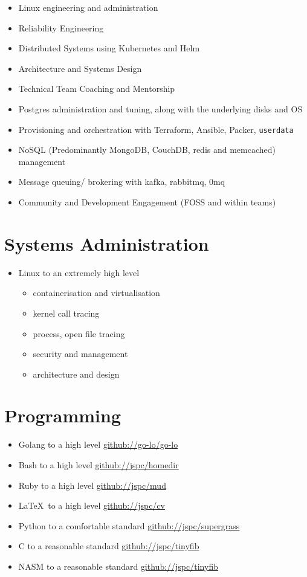 \documentclass[11pt,a4paper,sans]{article}
\begin{document}
\begin{itemize}
\item Linux engineering and administration
\item Reliability Engineering
\item Distributed Systems using Kubernetes and Helm
\item Architecture and Systems Design
\item Technical Team Coaching and Mentorship
\item Postgres administration and tuning, along with the underlying disks and OS
\item Provisioning and orchestration with Terraform, Ansible, Packer, \texttt{userdata}
\item NoSQL (Predominantly MongoDB, CouchDB, redis and memcached) management
\item Message queuing/ brokering with kafka, rabbitmq, 0mq
\item Community and Development Engagement (FOSS and within teams)
\end{itemize}

\section{Systems Administration}

\begin{itemize}
\item Linux to an extremely high level
  \begin{itemize}
  \item containerisation and virtualisation
  \item kernel call tracing
  \item process, open file tracing
  \item security and management
  \item architecture and design
  \end{itemize}
\end{itemize}

\section{Programming}

\begin{itemize}
\item Golang to a high level \href{https://github.com/go-lo/go-lo}{github://go-lo/go-lo}
\item Bash to a high level \href{https://github.com/jspc/homedir}{github://jspc/homedir}
\item Ruby to a high level \href{https://github.com/jspc/mud}{github://jspc/mud}
\item \LaTeX \ to a high level \href{https://github.com/jspc/cv}{github://jspc/cv}
\item Python to a comfortable standard \href{https://github.com/jspc/supergrass}{github://jspc/supergrass}
\item C to a reasonable standard \href{https://github.com/jspc/tinyfib}{github://jspc/tinyfib}
\item NASM to a reasonable standard \href{https://github.com/jspc/tinyfib}{github://jspc/tinyfib}
\end{itemize}
\end{document}
